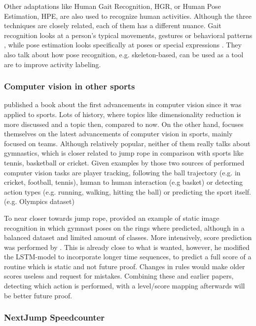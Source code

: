 Other adaptations like Human Gait Recognition, HGR, or Human Pose Estimation, HPE, are also used to recognize human activities. Although the three techniques are closely related, each of them has a different nuance. Gait recognition looks at a person's typical movements, gestures or behavioral patterns \autocite{Alharthi_2019}, while pose estimation looks specifically at poses or special expressions \autocite{Song_2021}. They also talk about how pose recognition, e.g. skeleton-based, can be used as a tool are to improve activity labeling.

\subsubsection{Computer vision in other sports}
\label{proposal-subsubsec:literature-computer-vision-sports}

\textcite{Soomro_2014} published a book about the first advancements in computer vision since it was applied to sports. Lots of history, where topics like dimensionality reduction is more discussed and a topic then, compared to now. On the other hand, \textcite{Yin_2024} focuses themselves on the latest advancements of computer vision in sports, mainly focused on teams. Although relatively popular, neither of them really talks about gymnastics, which is closer related to jump rope in comparison with sports like tennis, basketball or cricket.
Given examples by those two sources of performed computer vision tasks are player tracking, following the ball trajectory (e.g. in cricket, football, tennis), human to human interaction (e.g basket) or detecting action types (e.g. running, walking, hitting the ball) or predicting the sport itself. (e.g. Olympics dataset)

To near closer towards jump rope, \textcite{Abdullah_2023} provided an example of static image recognition in which gymnast poses on the rings where predicted, although in a balanced dataset and limited amount of classes. More intensively, score prediction was performed by \textcite{Zahan_2023}. This is already close to what is wanted, however, he modified the LSTM-model to incorporate longer time sequences, to predict a full score of a routine which is static and not future proof. Changes in rules would make older scores useless and request for mistakes.
Combining these and earlier papers, detecting which action is performed, with a level/score mapping afterwards will be better future proof.

\subsubsection{NextJump Speedcounter}
\label{proposal-subsubsec:literature-nextjump-speedcounter}

